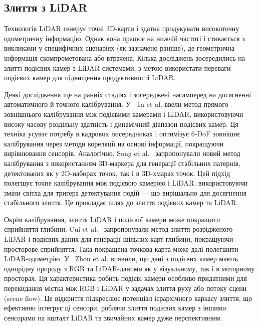 \subsection{Злиття з LiDAR}
Технологія LiDAR генерує точні 3D-карти і здатна продукувати високоточну одометричну інформацію. Однак вона працює на нижчій частоті і стикається з викликами у специфічних сценаріях (як зазначено раніше), де геометрична інформація скомпрометована або втрачена. Кілька досліджень зосередились на злитті подієвих камер з LiDAR-системами, з метою використати переваги подієвих камер для підвищення продуктивності LiDAR.

Деякі дослідження ще на ранніх стадіях і зосереджені насамперед на досягненні автоматичного й точного калібрування.
У~\cite{10161220} Ta et al. ввели метод прямого зовнішнього калібрування між подієвими камерами і LiDAR, використовуючи високу часову роздільну здатність і динамічний діапазон подієвих камер. Ця техніка усуває потребу в кадрових посередниках і оптимізує 6-DoF зовнішнє калібрування через методи кореляції на основі інформації, покращуючи вирівнювання сенсорів. Аналогічно, Song et al.~\cite{8584215} запропонували новий метод калібрування з використанням 3D-маркера для генерації стабільних патернів, детектованих як у 2D-наборах точок, так і в 3D-хмарах точок. Цей підхід полегшує точне калібрування між подієвою камерою і LiDAR, використовуючи зміни світла для тригера детектування подій — що вирішально для досягнення стабільного злиття. Це прокладає шлях до злиття подієвих камер та LiDAR.

Окрім калібрування, злиття LiDAR і подієвої камери може покращити сприйняття глибини. Cui et al.~\cite{9686362} запропонували метод злиття розрідженого LiDAR і подієвих даних для генерації щільних карт глибини, покращуючи просторове сприйняття. Така покращена точкова карта може далі полегшити LiDAR-одометрію. У~\cite{zhou2024bring} Zhou et al. виявили, що дані з подієвих камер мають однорідну природу з RGB та LiDAR-даними як у візуальному, так і в моторному просторах. Ця характеристика робить подієві камери особливо придатними для перекидання містка між RGB і LiDAR у задачах злиття руху або потоку сцени (scene flow). Це відкриття підкреслює потенціал ієрархічного каркасу злиття, що ефективно інтегрує ці сенсори, роблячи злиття подієвих камер з іншими сенсорами на кшталт LiDAR та звичайних камер дуже перспективним.
